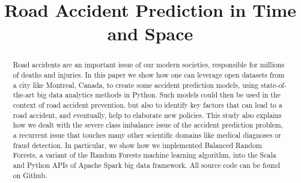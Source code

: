 \documentclass[conference]{IEEEtran}
\begin{document}
\title{Road Accident Prediction in Time and Space}

\author{
\and
{}
\and
{}
\and
{}
}

\maketitle

\begin{abstract}
Road accidents are an important issue of our modern societies, responsible for millions of deaths and injuries. In this paper we show how one can leverage open datasets from a city like Montreal, Canada, to create some accident prediction models, using state-of-the-art big data analytics methods in Python. Such models could then be used in the context of road accident prevention, but also to identify key factors that can lead to a road accident, and eventually, help to elaborate new policies. This study also explains how we dealt with the severe class imbalance issue of the accident prediction problem, a recurrent issue that touches many other scientific domains like medical diagnoses or fraud detection. In particular, we show how we implemented Balanced Random Forests, a variant of the Random Forests machine learning algorithm, into the Scala and Python APIs of Apache Spark big data framework. All source code can be found on Github.

\end{abstract}
\end{document}
